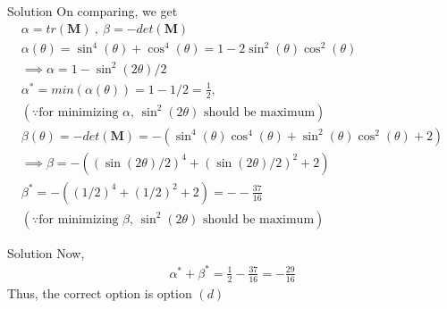 \documentclass{beamer}
\renewcommand{\vec}[1]{\mathbf{#1}}
\providecommand{\brak}[1]{\ensuremath{\left(#1\right)}}
\theoremstyle{remark}
\begin{document}
\begin{frame}{Solution}
On comparing, we get
\begin{align}
    \alpha = tr\brak{\vec{M}} \ , \ \beta = - det\brak{\vec{M}}\\
    \alpha\brak{\theta}=\sin^4\brak{\theta}+\cos^4\brak{\theta} = 1-2\sin^2\brak{\theta}\cos^2\brak{\theta}\\
    \implies \alpha = 1 -\sin^2\brak{2\theta}/2 \\
    \alpha^*  = min\brak{\alpha\brak{\theta}}= 1- 1/2 = \frac{1}{2} ,\\ \brak{\because \text{for minimizing $\alpha$,  $\sin^2\brak{2\theta}$ should be maximum}}\nonumber\\
    \beta\brak{\theta} = - det\brak{\vec{M}} = - \brak{\sin^4\brak{\theta}\cos^4\brak{\theta} + \sin^2\brak{\theta}\cos^2\brak{\theta} +2}\\
    \implies \beta = - \brak{ \brak{\sin\brak{2\theta}/2}^4 + \brak{\sin\brak{2\theta}/2}^2 + 2} \\
    \beta^* = - \brak{ \brak{1/2}^4 + \brak{1/2}^2 + 2}=--\frac{37}{16}\\
    \brak{\because \text{for minimizing $\beta$,  $\sin^2\brak{2\theta}$ should be maximum}}\nonumber
\end{align}
\end{frame}
\begin{frame}{Solution}
    Now, 
\begin{align}
    \alpha^*+\beta^* = \frac{1}{2} - \frac{37}{16} = -\frac{29}{16}
\end{align}
Thus,  the correct option is option $\brak{d}$
\end{frame}
\end{document}
